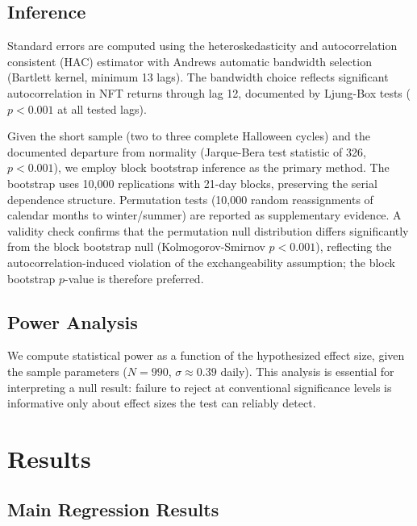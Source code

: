 \documentclass[12pt,a4paper]{article}
\begin{document}
\subsection{Inference}

Standard errors are computed using the \citet{Newey1987} heteroskedasticity and autocorrelation consistent (HAC) estimator with Andrews automatic bandwidth selection (Bartlett kernel, minimum 13 lags). The bandwidth choice reflects significant autocorrelation in NFT returns through lag 12, documented by Ljung-Box tests ($p < 0.001$ at all tested lags).

Given the short sample (two to three complete Halloween cycles) and the documented departure from normality (Jarque-Bera test statistic of 326, $p < 0.001$), we employ block bootstrap inference as the primary method. The bootstrap uses 10,000 replications with 21-day blocks, preserving the serial dependence structure. Permutation tests (10,000 random reassignments of calendar months to winter/summer) are reported as supplementary evidence. A validity check confirms that the permutation null distribution differs significantly from the block bootstrap null (Kolmogorov-Smirnov $p < 0.001$), reflecting the autocorrelation-induced violation of the exchangeability assumption; the block bootstrap $p$-value is therefore preferred.

\subsection{Power Analysis}

We compute statistical power as a function of the hypothesized effect size, given the sample parameters ($N = 990$, $\sigma \approx 0.39$ daily). This analysis is essential for interpreting a null result: failure to reject at conventional significance levels is informative only about effect sizes the test can reliably detect.



\section{Results}\label{sec:results}

\subsection{Main Regression Results}
\end{document}
